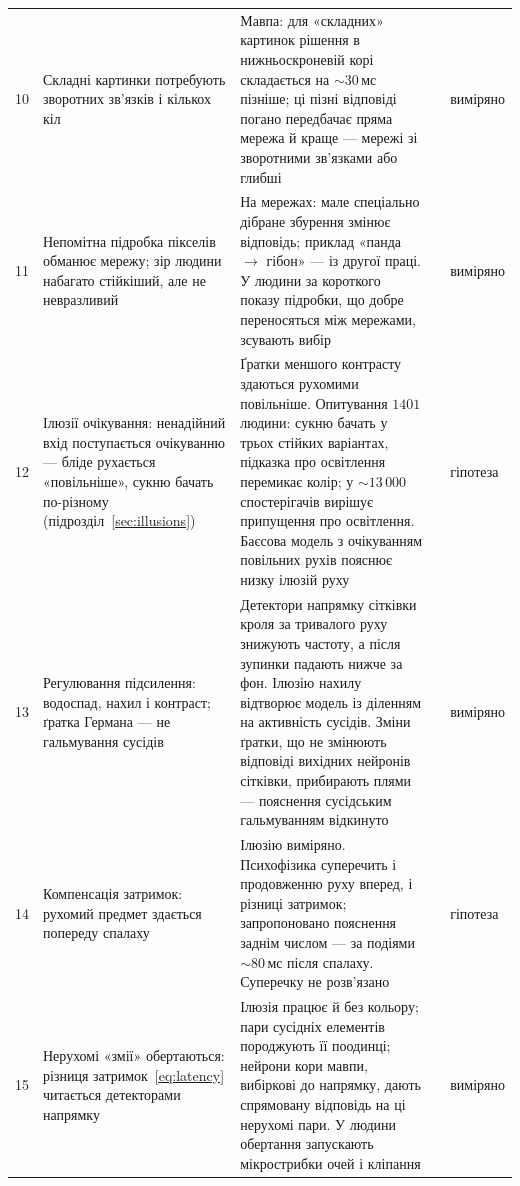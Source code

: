 {\begin{longtable}{>{\raggedright}p{0.5cm}>{\raggedright}p{4.0cm}>{\raggedright}p{5.6cm}>{\raggedright}p{2.3cm}>{\raggedright\arraybackslash}p{1.7cm}}
10 & Складні картинки потребують зворотних зв'язків і кількох кіл & Мавпа: для «складних» картинок рішення в нижньоскроневій корі складається на $\sim30$\,мс пізніше; ці пізні відповіді погано передбачає пряма мережа й краще --- мережі зі зворотними зв'язками або глибші & \cite{Kar2019} & виміряно \\
11 & Непомітна підробка пікселів обманює мережу; зір людини набагато стійкіший, але не невразливий & На мережах: мале спеціально дібране збурення змінює відповідь; приклад «панда $\to$ гібон» --- із другої праці. У людини за короткого показу підробки, що добре переносяться між мережами, зсувають вибір & \cite{Szegedy2014,Goodfellow2015,Elsayed2018} & виміряно \\
12 & Ілюзії очікування: ненадійний вхід поступається очікуванню --- бліде рухається «повільніше», сукню бачать по-різному (підрозділ~\ref{sec:illusions}) & Ґратки меншого контрасту здаються рухомими повільніше. Опитування $1401$ людини: сукню бачать у трьох стійких варіантах, підказка про освітлення перемикає колір; у $\sim13\,000$ спостерігачів вирішує припущення про освітлення. Баєсова модель з очікуванням повільних рухів пояснює низку ілюзій руху & \cite{Thompson1982,LaferSousa2015,Wallisch2017,Weiss2002,Purves2011} & гіпотеза \\
13 & Регулювання підсилення: водоспад, нахил і контраст; ґратка Германа --- не гальмування сусідів & Детектори напрямку сітківки кроля за тривалого руху знижують частоту, а після зупинки падають нижче за фон. Ілюзію нахилу відтворює модель із діленням на активність сусідів. Зміни ґратки, що не змінюють відповіді вихідних нейронів сітківки, прибирають плями --- пояснення сусідським гальмуванням відкинуто & \cite{BarlowHill1963,Schwartz2009,SchillerCarvey2005} & виміряно \\
14 & Компенсація затримок: рухомий предмет здається попереду спалаху & Ілюзію виміряно. Психофізика суперечить і продовженню руху вперед, і різниці затримок; запропоновано пояснення заднім числом --- за подіями $\sim80$\,мс після спалаху. Суперечку не розв'язано & \cite{Nijhawan1994,EaglemanSejnowski2000} & гіпотеза \\
15 & Нерухомі «змії» обертаються: різниця затримок~\eqref{eq:latency} читається детекторами напрямку & Ілюзія працює й без кольору; пари сусідніх елементів породжують її поодинці; нейрони кори мавпи, вибіркові до напрямку, дають спрямовану відповідь на ці нерухомі пари. У людини обертання запускають мікрострибки очей і кліпання & \cite{Conway2005,OteroMillan2012} & виміряно \\

\end{longtable}}
